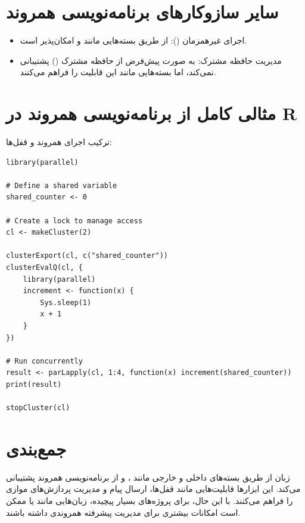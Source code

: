 \documentclass[11pt, a4paper, oneside]{book}
\begin{document}
		\section{سایر سازوکارهای برنامه‌نویسی همروند}
		
			\begin{itemize}
				
				\item {\large اجرای غیرهمزمان ()}:
				از طریق بسته‌هایی مانند  و  امکان‌پذیر است.
				
				\item {\large مدیریت حافظه مشترک}:
				به صورت پیش‌فرض از حافظه مشترک () پشتیبانی نمی‌کند، اما بسته‌هایی مانند  این قابلیت را فراهم می‌کنند.
				
			\end{itemize}
		
		\section{مثالی کامل از برنامه‌نویسی همروند در R}
		
			ترکیب اجرای همروند و قفل‌ها:
			
			\begin{latin}
				\begin{lstlisting}[caption={\lr{Combination of concurrent execution and locks}}] 
library(parallel)

# Define a shared variable
shared_counter <- 0

# Create a lock to manage access
cl <- makeCluster(2)

clusterExport(cl, c("shared_counter"))
clusterEvalQ(cl, {
	library(parallel)
	increment <- function(x) {
		Sys.sleep(1)
		x + 1
	}
})

# Run concurrently
result <- parLapply(cl, 1:4, function(x) increment(shared_counter))
print(result)

stopCluster(cl)

				\end{lstlisting}
			\end{latin}
		
		\section{جمع‌بندی}
		
			زبان  از طریق بسته‌های داخلی و خارجی مانند ،  و  از برنامه‌نویسی همروند پشتیبانی می‌کند. این ابزارها قابلیت‌هایی مانند قفل‌ها، ارسال پیام و مدیریت پردازش‌های موازی را فراهم می‌کنند. با این حال، برای پروژه‌های بسیار پیچیده، زبان‌هایی مانند  یا  ممکن است امکانات بیشتری برای مدیریت پیشرفته همروندی داشته باشند.
			
\end{document}
